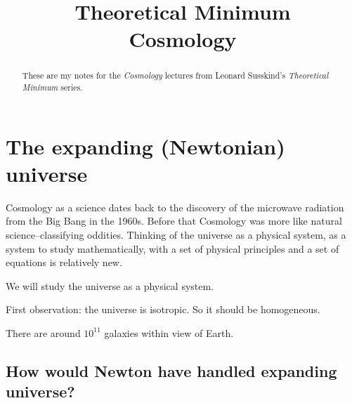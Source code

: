 \documentclass[]{article}
\title{Theoretical Minimum\\Cosmology}
\author{}
\begin{document}
\maketitle

\begin{abstract}
	These are my notes for the \emph{Cosmology}\cite{susskind2013cosmology} lectures from Leonard Susskind's \emph{Theoretical Minimum} series\cite{susskind2007theoretical}. 
\end{abstract}

\tableofcontents
\listoffigures
\listoftables
\listoftheorems

\section{The expanding (Newtonian) universe}

Cosmology as a science dates back to the discovery of the microwave radiation from the Big Bang in the 1960s. Before that Cosmology was more like natural science--classifying oddities. Thinking of the universe as a physical system, as a system to study mathematically, with a set of physical principles and a set of equations is relatively new.

We will study the universe as a physical system.

First observation: the universe is isotropic. So it should be homogeneous.

There are around $10^{11}$ galaxies within view of Earth.

\subsection{How would Newton have handled expanding universe?}
\end{document}
